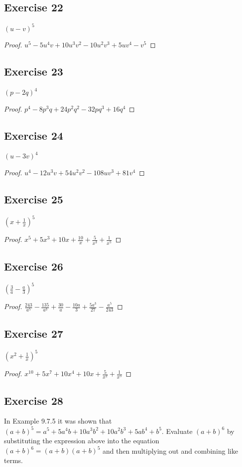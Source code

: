 \documentclass[14pt]{extarticle}
\begin{document}
\subsection{Exercise 22}
\((u-v)^5\)
\begin{proof}
     \(u^5 -5u^4v +10u^3v^2 -10u^2v^3 +5uv^4 -v^5\)
\end{proof}

\subsection{Exercise 23}
\((p-2q)^4\)
\begin{proof}
     \(p^4 - 8p^3q + 24p^2q^2 - 32pq^3 + 16q^4\)
\end{proof}

\subsection{Exercise 24}
\((u-3v)^4\)
\begin{proof}
     \(u^4 - 12u^3v + 54u^2v^2 - 108uv^3 + 81v^4\)
\end{proof}

\subsection{Exercise 25}
\(\left(x+\frac{1}{x}\right)^5\)
\begin{proof}
     \(x^5 + 5x^3 + 10x + \frac{10}{x} + \frac{5}{x^3} + \frac{1}{x^5}\)
\end{proof}

\subsection{Exercise 26}
\(\left(\frac{3}{a}-\frac{a}{3}\right)^5\)
\begin{proof}
     \(\frac{243}{a^5} - \frac{135}{a^3} + \frac{30}{a} - \frac{10a}{3} + \frac{5a^3}{27} - \frac{a^5}{243}\)
\end{proof}

\subsection{Exercise 27}
\(\left(x^2+\frac{1}{x}\right)^5\)
\begin{proof}
     \(x^{10} + 5x^7 + 10x^4 + 10x + \frac{5}{x^2} + \frac{1}{x^5}\)
\end{proof}

\subsection{Exercise 28}
In Example 9.7.5 it was shown that \((a + b)^5 = a^5 + 5a^4b + 10a^3b^2 + 10a^2b^3 + 5ab^4 + b^5\). Evaluate \((a + b)^6\) by
substituting the expression above into the equation \((a + b)^6 = (a + b)(a + b)^5\) and then multiplying out and
combining like terms.
\end{document}
